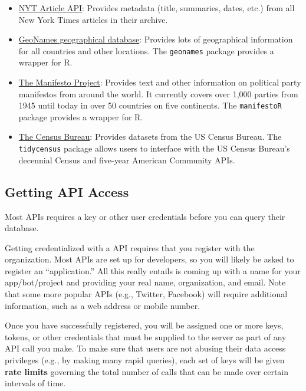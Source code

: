 \documentclass[
]{book}
\providecommand{\tightlist}{%
  \setlength{\itemsep}{0pt}\setlength{\parskip}{0pt}}
\begin{document}
\begin{itemize}
\tightlist
\item
  \href{http://developer.nytimes.com/}{NYT Article API}: Provides metadata (title, summaries, dates, etc.) from all New York Times articles in their archive.
\item
  \href{https://www.geonames.org/}{GeoNames geographical database}: Provides lots of geographical information for all countries and other locations. The \texttt{geonames} package provides a wrapper for R.
\item
  \href{https://manifesto-project.wzb.eu/.}{The Manifesto Project}: Provides text and other information on political party manifestos from around the world. It currently covers over 1,000 parties from 1945 until today in over 50 countries on five continents. The \texttt{manifestoR} package provides a wrapper for R.
\item
  \href{https://www.census.gov/developers/}{The Census Bureau}: Provides datasets from the US Census Bureau. The \texttt{tidycensus} package allows users to interface with the US Census Bureau's decennial Census and five-year American Community APIs.
\end{itemize}

\hypertarget{getting-api-access}{%
\subsection{Getting API Access}\label{getting-api-access}}

Most APIs requires a key or other user credentials before you can query their database.

Getting credentialized with a API requires that you register with the organization. Most APIs are set up for developers, so you will likely be asked to register an ``application.'' All this really entails is coming up with a name for your app/bot/project and providing your real name, organization, and email. Note that some more popular APIs (e.g., Twitter, Facebook) will require additional information, such as a web address or mobile number.

Once you have successfully registered, you will be assigned one or more keys, tokens, or other credentials that must be supplied to the server as part of any API call you make. To make sure that users are not abusing their data access privileges (e.g., by making many rapid queries), each set of keys will be given \textbf{rate limits} governing the total number of calls that can be made over certain intervals of time.
\end{document}
